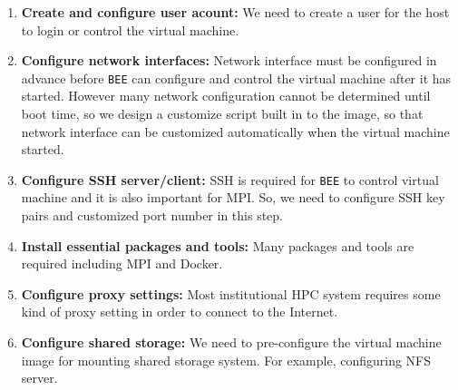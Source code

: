 \begin{enumerate}
\item \textbf{Create and configure user acount:} We need to create a user for the host to login or control the virtual machine.
\item \textbf{Configure network interfaces:} Network interface must be configured in advance before \texttt{BEE} can configure and control the virtual machine after it has started. However many network configuration cannot be determined until boot time, so we design a customize script built in to the image, so that network interface can be customized automatically when the virtual machine started.
\item \textbf{Configure SSH server/client:} SSH is required for \texttt{BEE} to control virtual machine and it is also important for MPI. So, we need to configure SSH key pairs and customized port number in this step.
\item \textbf{Install essential packages and tools:} Many packages and tools are required including MPI and Docker.
\item \textbf{Configure proxy settings:} Most institutional HPC system requires some kind of proxy setting in order to connect to the Internet. 
\item \textbf{Configure shared storage:} We need to pre-configure the virtual machine image for mounting shared storage system. For example, configuring NFS server.
\end{enumerate} 

